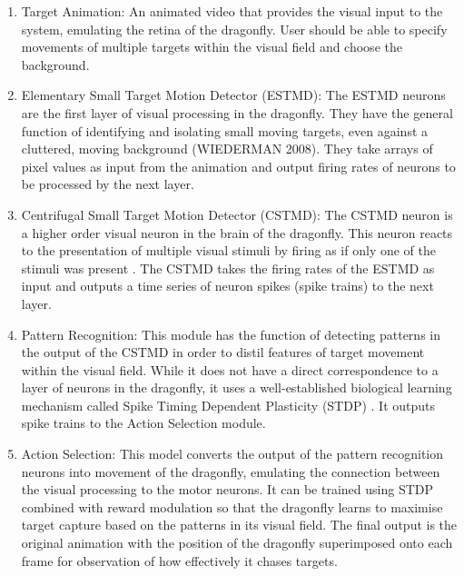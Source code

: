 \documentclass[a4paper,11pt]{article}
\begin{document}
\begin{enumerate}
\item{Target Animation:} An animated video that provides the visual input to the system, emulating the retina of the dragonfly. User should be able to specify movements of multiple targets within the visual field and choose the background.
\item{Elementary Small Target Motion Detector (ESTMD):} The ESTMD neurons are the first layer of visual processing in the dragonfly. They have the general function of identifying and isolating small moving targets, even against a cluttered, moving background (WIEDERMAN 2008). They take arrays of pixel values as input from the animation and output firing rates of neurons to be processed by the next layer.
\item{Centrifugal Small Target Motion Detector (CSTMD):} The CSTMD neuron is a higher order visual neuron in the brain of the dragonfly. This neuron reacts to the presentation of multiple visual stimuli by firing as if only one of the stimuli was present \cite{w13}. The CSTMD takes the firing rates of the ESTMD as input and outputs a time series of neuron spikes (spike trains) to the next layer.
\item{Pattern Recognition:} This module has the function of detecting patterns in the output of the CSTMD in order to distil features of target movement within the visual field. While it does not have a direct correspondence to a layer of neurons in the dragonfly, it uses a well-established biological learning mechanism called Spike Timing Dependent Plasticity (STDP) \cite{stdp1}\cite{stdp2}. It outputs spike trains to the Action Selection module.
\item{Action Selection:} This model converts the output of the pattern recognition neurons into movement of the dragonfly, emulating the connection between the visual processing to the motor neurons. It can be trained using STDP combined with reward modulation so that the dragonfly learns to maximise target capture based on the patterns in its visual field. The final output is the original animation with the position of the dragonfly superimposed onto each frame for observation of how effectively it chases targets.
\end{enumerate}
\end{document}

